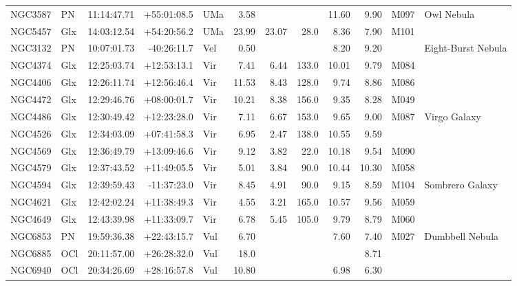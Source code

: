 \documentclass[11pt]{article}
\begin{document}
\begin{longtable}{llrrlrrrrrrl}
  NGC3587 & PN      & 11:14:47.71 & +55:01:08.5 & UMa   & 3.58   &        &       & 11.60 & 9.90  & M097    & Owl Nebula                     \\
  NGC5457 & Glx     & 14:03:12.54 & +54:20:56.2 & UMa   & 23.99  & 23.07  & 28.0  & 8.36  & 7.90  & M101    &                                \\
  NGC3132 & PN      & 10:07:01.73 & -40:26:11.7 & Vel   & 0.50   &        &       & 8.20  & 9.20  &         & Eight-Burst Nebula             \\
  NGC4374 & Glx     & 12:25:03.74 & +12:53:13.1 & Vir   & 7.41   & 6.44   & 133.0 & 10.01 & 9.79  & M084    &                                \\
  NGC4406 & Glx     & 12:26:11.74 & +12:56:46.4 & Vir   & 11.53  & 8.43   & 128.0 & 9.74  & 8.86  & M086    &                                \\
  NGC4472 & Glx     & 12:29:46.76 & +08:00:01.7 & Vir   & 10.21  & 8.38   & 156.0 & 9.35  & 8.28  & M049    &                                \\
  NGC4486 & Glx     & 12:30:49.42 & +12:23:28.0 & Vir   & 7.11   & 6.67   & 153.0 & 9.65  & 9.00  & M087    & Virgo Galaxy                   \\
  NGC4526 & Glx     & 12:34:03.09 & +07:41:58.3 & Vir   & 6.95   & 2.47   & 138.0 & 10.55 & 9.59  &         &                                \\
  NGC4569 & Glx     & 12:36:49.79 & +13:09:46.6 & Vir   & 9.12   & 3.82   & 22.0  & 10.18 & 9.54  & M090    &                                \\
  NGC4579 & Glx     & 12:37:43.52 & +11:49:05.5 & Vir   & 5.01   & 3.84   & 90.0  & 10.44 & 10.30 & M058    &                                \\
  NGC4594 & Glx     & 12:39:59.43 & -11:37:23.0 & Vir   & 8.45   & 4.91   & 90.0  & 9.15  & 8.59  & M104    & Sombrero Galaxy                \\
  NGC4621 & Glx     & 12:42:02.24 & +11:38:49.3 & Vir   & 4.55   & 3.21   & 165.0 & 10.57 & 9.56  & M059    &                                \\
  NGC4649 & Glx     & 12:43:39.98 & +11:33:09.7 & Vir   & 6.78   & 5.45   & 105.0 & 9.79  & 8.79  & M060    &                                \\
  NGC6853 & PN      & 19:59:36.38 & +22:43:15.7 & Vul   & 6.70   &        &       & 7.60  & 7.40  & M027    & Dumbbell Nebula                \\
  NGC6885 & OCl     & 20:11:57.00 & +26:28:32.0 & Vul   & 18.0   &        &       &       & 8.71  &         &                                \\
  NGC6940 & OCl     & 20:34:26.69 & +28:16:57.8 & Vul   & 10.80  &        &       & 6.98  & 6.30  &         &                                \\
  \bottomrule
\end{longtable}
\end{document}
